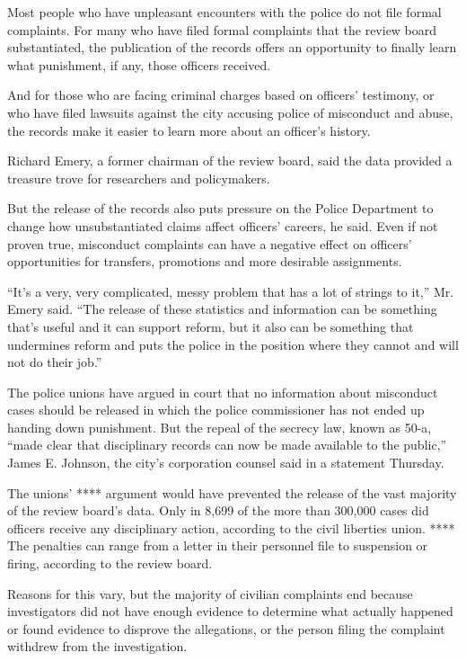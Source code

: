 Most people who have unpleasant encounters with the police do not file
formal complaints. For many who have filed formal complaints that the
review board substantiated, the publication of the records offers an
opportunity to finally learn what punishment, if any, those officers
received.

And for those who are facing criminal charges based on officers'
testimony, or who have filed lawsuits against the city accusing police
of misconduct and abuse, the records make it easier to learn more about
an officer's history.

Richard Emery, a former chairman of the review board, said the data
provided a treasure trove for researchers and policymakers.

But the release of the records also puts pressure on the Police
Department to change how unsubstantiated claims affect officers'
careers, he said. Even if not proven true, misconduct complaints can
have a negative effect on officers' opportunities for transfers,
promotions and more desirable assignments.

``It's a very, very complicated, messy problem that has a lot of strings
to it,'' Mr. Emery said. ``The release of these statistics and
information can be something that's useful and it can support reform,
but it also can be something that undermines reform and puts the police
in the position where they cannot and will not do their job.''

The police unions have argued in court that no information about
misconduct cases should be released in which the police commissioner has
not ended up handing down punishment. But the repeal of the secrecy law,
known as 50-a, ``made clear that disciplinary records can now be made
available to the public,'' James E. Johnson, the city's corporation
counsel said in a statement Thursday.

The unions' **** argument would have prevented the release of the vast
majority of the review board's data. Only in 8,699 of the more than
300,000 cases did officers receive any disciplinary action, according to
the civil liberties union. **** The penalties can range from a letter in
their personnel file to suspension or firing, according to the review
board.

Reasons for this vary, but the majority of civilian complaints end
because investigators did not have enough evidence to determine what
actually happened or found evidence to disprove the allegations, or the
person filing the complaint withdrew from the investigation.

